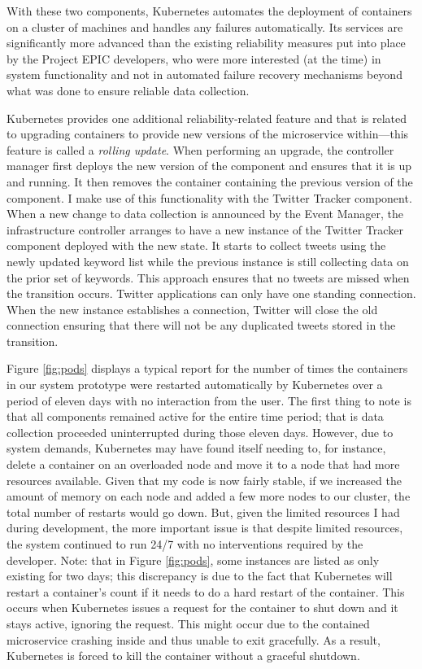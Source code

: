 With these two components, Kubernetes automates the deployment of containers on a cluster of machines and handles any failures automatically. Its services are significantly more advanced than the existing reliability measures put into place by the Project EPIC developers, who were more interested (at the time) in system functionality and not in automated failure recovery mechanisms beyond what was done to ensure reliable data collection.

Kubernetes provides one additional reliability-related feature and that is related to upgrading containers to provide new versions of the microservice within---this feature is called a \textit{rolling update}. When performing an upgrade, the controller manager first deploys the new version of the component and ensures that it is up and running. It then removes the container containing the previous version of the component. I make use of this functionality with the Twitter Tracker component. When a new change to data collection is announced by the Event Manager, the infrastructure controller arranges to have a new instance of the Twitter Tracker component deployed with the new state. It starts to collect tweets using the newly updated keyword list while the previous instance is still collecting data on the prior set of keywords. This approach ensures that no tweets are missed when the transition occurs. Twitter applications can only have one standing connection. When the new instance establishes a connection, Twitter will close the old connection ensuring that there will not be any duplicated tweets stored in the transition.

Figure \ref{fig:pods} displays a typical report for the number of times the containers in our system prototype were restarted automatically by Kubernetes over a period of eleven days with no interaction from the user. The first thing to note is that all components remained active for the entire time period; that is data collection proceeded uninterrupted during those eleven days. However, due to system demands, Kubernetes may have found itself needing to, for instance, delete a container on an overloaded node and move it to a node that had more resources available. Given that my code is now fairly stable, if we increased the amount of memory on each node and added a few more nodes to our cluster, the total number of restarts would go down. But, given the limited resources I had during development, the more important issue is that despite limited resources, the system continued to run 24/7 with no interventions required by the developer.  Note: that in Figure \ref{fig:pods}, some instances are listed as only existing for two days; this discrepancy is due to the fact that Kubernetes will restart a container’s count if it needs to do a hard restart of the container. This occurs when Kubernetes issues a request for the container to shut down and it stays active, ignoring the request. This might occur due to the contained microservice crashing inside and thus unable to exit gracefully. As a result, Kubernetes is forced to kill the container without a graceful shutdown.

